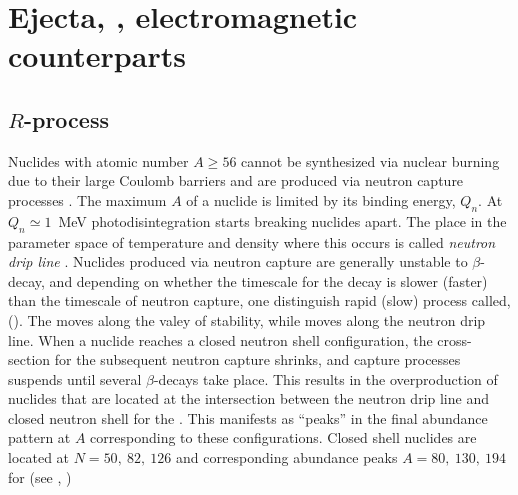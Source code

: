 \section{Ejecta, \nuc{}, electromagnetic counterparts}

\subsection{$R$-process \nuc{}}

Nuclides with atomic number  $A{\geq}56$ cannot be synthesized via nuclear burning 
due to their large Coulomb barriers and are produced via 
neutron capture processes \citep{Burbidge:1957}.
The maximum $A$ of a nuclide is limited by its binding energy, $Q_n$. 
At $Q_n{\simeq1}$~MeV photodisintegration starts breaking nuclides apart. 
The place in the parameter space of temperature and density where this occurs 
is called \textit{neutron drip line} \citep{Rolfs:1988}.
Nuclides produced via neutron capture are generally unstable to $\beta$-decay,
and depending on whether the timescale for the decay is slower (faster) than 
the timescale of neutron capture, one distinguish rapid (slow) process called,
\rproc{} (\sproc{}).
%
The \sproc{} moves along the valey of stability, while \rproc{} moves along the 
neutron drip line.
%
When a nuclide reaches a closed neutron shell configuration, the cross-section 
for the subsequent neutron capture shrinks, and capture processes suspends until 
several $\beta$-decays take place. This results in the overproduction of nuclides 
that are located at the intersection between the neutron drip line and closed 
neutron shell for the \rproc{}. This manifests as ``peaks'' in the final abundance 
pattern at $A$ corresponding to these configurations.
Closed shell nuclides are located at $N=50,\: 82, \: 126$ and 
corresponding abundance peaks $A=80,\:130,\:194$ for \rproc{} 
(see \eg, \citet{Arnould:2007gh})

